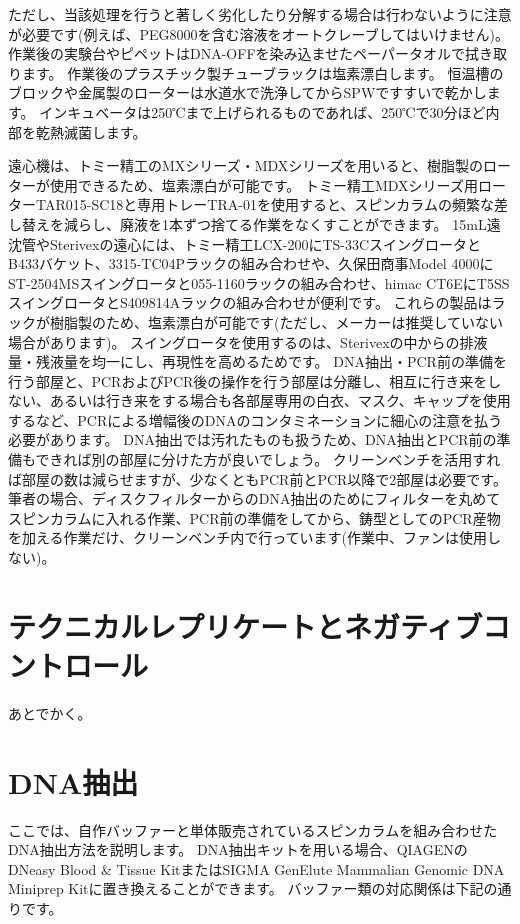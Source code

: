 \documentclass[titlepage,10pt,a4paper]{jsbook}
\begin{document}
ただし、当該処理を行うと著しく劣化したり分解する場合は行わないように注意が必要です(例えば、PEG8000を含む溶液をオートクレーブしてはいけません)。
作業後の実験台やピペットはDNA-OFFを染み込ませたペーパータオルで拭き取ります。
作業後のプラスチック製チューブラックは塩素漂白します。
恒温槽のブロックや金属製のローターは水道水で洗浄してからSPWですすいで乾かします。
インキュベータは250℃まで上げられるものであれば、250℃で30分ほど内部を乾熱滅菌します。

遠心機は、トミー精工のMXシリーズ・MDXシリーズを用いると、樹脂製のローターが使用できるため、塩素漂白が可能です。
トミー精工MDXシリーズ用ローターTAR015-SC18と専用トレーTRA-01を使用すると、スピンカラムの頻繁な差し替えを減らし、廃液を1本ずつ捨てる作業をなくすことができます。
15mL遠沈管やSterivexの遠心には、トミー精工LCX-200にTS-33CスイングロータとB433バケット、3315-TC04Pラックの組み合わせや、久保田商事Model 4000にST-2504MSスイングロータと055-1160ラックの組み合わせ、himac CT6EにT5SSスイングロータとS409814Aラックの組み合わせが便利です。
これらの製品はラックが樹脂製のため、塩素漂白が可能です(ただし、メーカーは推奨していない場合があります)。
スイングロータを使用するのは、Sterivexの中からの排液量・残液量を均一にし、再現性を高めるためです。
DNA抽出・PCR前の準備を行う部屋と、PCRおよびPCR後の操作を行う部屋は分離し、相互に行き来をしない、あるいは行き来をする場合も各部屋専用の白衣、マスク、キャップを使用するなど、PCRによる増幅後のDNAのコンタミネーションに細心の注意を払う必要があります。
DNA抽出では汚れたものも扱うため、DNA抽出とPCR前の準備もできれば別の部屋に分けた方が良いでしょう。
クリーンベンチを活用すれば部屋の数は減らせますが、少なくともPCR前とPCR以降で2部屋は必要です。
筆者の場合、ディスクフィルターからのDNA抽出のためにフィルターを丸めてスピンカラムに入れる作業、PCR前の準備をしてから、鋳型としてのPCR産物を加える作業だけ、クリーンベンチ内で行っています(作業中、ファンは使用しない)。

\section{テクニカルレプリケートとネガティブコントロール}

あとでかく。

\section{DNA抽出}

ここでは、自作バッファーと単体販売されているスピンカラムを組み合わせたDNA抽出方法を説明します。
DNA抽出キットを用いる場合、QIAGENのDNeasy Blood \& Tissue KitまたはSIGMA GenElute Mammalian Genomic DNA Miniprep Kitに置き換えることができます。
バッファー類の対応関係は下記の通りです。
\end{document}
